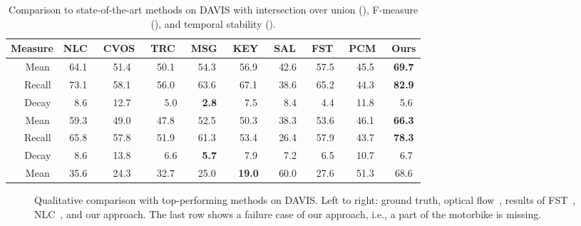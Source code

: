 \documentclass[10pt,twocolumn,letterpaper]{article}
\begin{document}
\begin{table*}
\begin{center}
\begin{tabular}{l | c | c cccccccc}
\hline
\multicolumn{2}{c|}{Measure} & NLC~\cite{Faktor14}  & CVOS~\cite{taylor2015causal} & TRC~\cite{fragkiadaki2012video} & MSG~\cite{brox2010object} & KEY~\cite{lee2011key} & SAL~\cite{wang2015saliency} & FST~\cite{papazoglou2013fast} & PCM~\cite{Bideau16} & Ours \\
\hline
\multirow{3}{*}{} & Mean & 64.1 & 51.4 & 50.1 & 54.3 & 56.9 & 42.6 & 57.5 & 45.5 & \textbf{69.7}  \\
& Recall & 73.1 & 58.1 & 56.0 & 63.6 & 67.1 & 38.6 & 65.2 & 44.3 & \textbf{82.9}  \\
& Decay & ~8.6 & 12.7 & ~~5.0 & ~\textbf{2.8} & ~7.5 & ~8.4 & ~4.4 & 11.8 & ~5.6  \\
\hline
\multirow{3}{*}{} & Mean & 59.3 & 49.0 & 47.8 & 52.5 & 50.3 & 38.3 & 53.6 & 46.1 & \textbf{66.3}  \\
& Recall & 65.8 & 57.8 & 51.9 & 61.3 & 53.4 & 26.4 & 57.9 & 43.7 & \textbf{78.3}  \\
& Decay & ~8.6 & 13.8 & ~~6.6 & ~\textbf{5.7} & ~7.9 & ~7.2 & ~6.5 & 10.7 & ~6.7  \\
\hline
 & Mean & 35.6 & 24.3 & 32.7 & 25.0 & \textbf{19.0} & 60.0 & 27.6 & 51.3 & 68.6  \\
\hline
\end{tabular}
\caption{Comparison to state-of-the-art methods on DAVIS with intersection over
union (), F-measure (), and temporal stability
().}
\label{tbl:soadavis}
\vspace{-0.7cm}
\end{center}
\end{table*}
\begin{figure*}[t]
\begin{center}
\vspace{0.1cm}
\vspace{0.1cm}
\end{center}
\vspace{-0.3cm}\caption{Qualitative comparison with top-performing methods on
DAVIS. Left to right: ground truth, optical flow~\cite{Brox11a}, results of
FST~\cite{papazoglou2013fast}, NLC~\cite{Faktor14}, and our approach. The last
row shows a failure case of our approach, i.e., a part of the motorbike is
missing.}
\vspace{-0.5cm}
\label{fig:davis}
\end{figure*}
\end{document}
